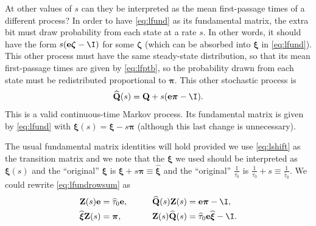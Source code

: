 \documentclass[12pt]{article}
\newcommand{\onev}{\mathbf{e}}
\newcommand{\MMm}{Q}
\newcommand{\MM}{\mathbf{\MMm}}
\newcommand{\eqm}{\pi}
\newcommand{\eq}{\boldsymbol{\eqm}}
\newcommand{\fundm}{Z}
\newcommand{\fund}{\mathbf{\fundm}}
\newcommand{\arowm}{\xi}
\newcommand{\arow}{\boldsymbol{\arowm}}
\newcommand{\shift}[1]{\widehat{#1}}
\begin{document}
At other values of \(s\) can they be interpreted as the mean first-passage times of a different process?
In order to have \cref{eq:lfund} as its fundamental matrix, the extra bit must draw probability from each state at a rate \(s\).
In other words, it should have the form \(s(\onev \boldsymbol{\zeta} - \I)\) for some \(\boldsymbol{\zeta} \) 
(which can be absorbed into \(\arow\) in \cref{eq:lfund}).
This other process must have the same steady-state distribution, so that its mean first-passage times are given by \cref{eq:lfptb}, so the probability drawn from each state must be redistributed proportional to \(\eq\).
This other stochastic process is
%
\begin{equation}\label{eq:lshift}
  \shift{\MM}(s) = \MM + s (\onev \eq - \I).
\end{equation}
%
This is a valid continuous-time Markov process.
Its fundamental matrix is given by \cref{eq:lfund} with \( \arow(s) = \arow - s \eq \) (although this last change is unnecessary).

The usual fundamental matrix identities will hold provided we use \cref{eq:lshift} as the transition matrix and we note that the \( \arow \) we used should be interpreted as \( \arow(s)\) and the ``original'' \( \arow \) is \( \arow + s \eq \equiv \shift{\arow}\) and the ``original'' \( \frac{1}{\tau_0} \) is \( \frac{1}{\tau_0} + s \equiv \frac{1}{\shift{\tau}_0}\).
We could rewrite \cref{eq:lfundrowsum} as
%
\begin{equation}\label{eq:lshiftrowsum}
\begin{aligned}
  \fund(s) \onev &= \shift{\tau}_0 \onev, \qquad &
  \shift{\MM}(s) \fund(s) &= \onev \eq - \I, \\ 
  \shift{\arow} \fund(s) &= \eq,  &
  \fund(s) \shift{\MM}(s) &= \shift{\tau}_0 \onev \shift{\arow} - \I.
\end{aligned}
\end{equation}
%
\end{document}
